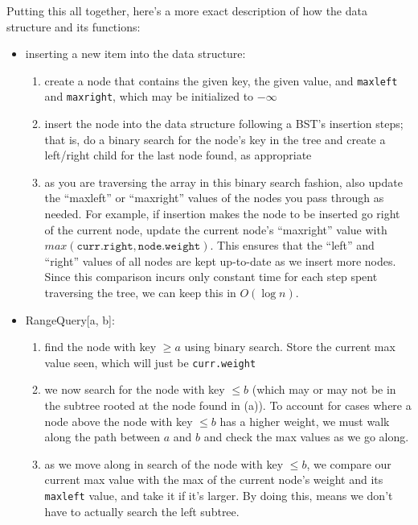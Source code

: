 \documentclass[12pt]{article}
\begin{document}
\begin{enumerate}
    Putting this all together, here's a more exact description of how the data structure and its functions:

    \begin{itemize}
        \item inserting a new item into the data structure:
        \begin{enumerate}
            \item create a node that contains the given key, the given value, and \texttt{maxleft} and \texttt{maxright}, which 
            may be initialized to $-\infty$
            \item insert the node into the data structure following a BST's insertion steps; that is, do a binary search 
            for the node's key in the tree and create a left/right child for the last node found, as appropriate
            \item as you are traversing the array in this binary search fashion, also update the ``maxleft'' or ``maxright'' values 
            of the nodes you pass through as needed. For example, if insertion makes the node to be inserted go right of the current node, 
            update the current node's ``maxright'' value with $max(\texttt{curr.right}, \texttt{node.weight})$. This 
            ensures that the ``left'' and ``right'' values of all nodes are kept up-to-date as we insert more nodes. 
            Since this comparison incurs only constant time for each step spent traversing the tree, we can keep this in 
            $O(\log n)$.
        \end{enumerate}

        \item RangeQuery[a, b]:
        \begin{enumerate}
            \item find the node with key $\geq a$ using binary search. Store the current max value seen, which will just 
            be \texttt{curr.weight}
            \item we now search for the node with key $\leq b$ (which may or may not be in the subtree rooted at the 
            node found in (a)). To account for cases where a node above the node with key $\leq b$ has a higher weight, 
            we must walk along the path between $a$ and $b$ and check the max values as we go along.
            \item as we move along in search of the node with key $\leq b$, we compare our current max value with 
            the max of the current node's weight and its \texttt{maxleft} value, and take it if it's larger. By doing this, 
            means we don't have to actually search the left subtree.
        \end{enumerate}
    \end{itemize}


\end{enumerate}
\end{document}
